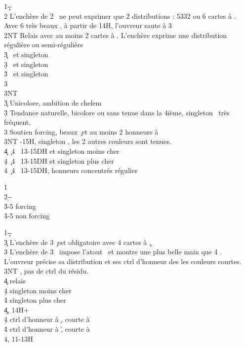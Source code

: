 \documentclass[a4paper]{article}
\begin{document}
\begin{bidtable}
1\c--\\
2\s \> L’enchère de 2 \s\ ne peut exprimer que 2 distributions : 5332 ou 6 cartes à \s .\\
\>Avec 6 très beaux \s , à partir de 14H, l’ouvreur saute à 3 \s \+\\
2NT \> Relais avec au moins 2 cartes à \s . L’enchère exprime une distribution régulière ou semi-régulière\+\\
3\c {} \s\ et singleton \c \\
3\d {} \s\ et singleton \d \\
3\h {} \s\ et singleton \h \\
3\s {}\\
3NT \-\\
3\c \> Unicolore, ambition de chelem\\
3\d\h \> Tendance naturelle, bicolore ou sans tenue dans la 4ième, singleton \s\ très fréquent.\\
3\s \> Soutien forcing, beaux \c\ et au moins 2 honneurs à \s \\
3NT -15H, singleton \s , les 2 autres couleurs sont tenues.\\
4\c {} \c\ 4 \s\ 13-15DH et singleton moins cher\\
4\d {} \c\ 4 \s\ 13-15DH et singleton plus cher\\
4\s {} \c\ 4 \s\ 13-15DH, honneurs concentrés régulier\-
\end{bidtable}

\begin{bidtable}
1\c\\
2\d--\\
3\h {}-5 forcing\\
4\h {}-5 non forcing
\end{bidtable}

\begin{bidtable}
1\c--\\
3\c \> L’enchère de 3 \c\ est obligatoire avec 4 cartes à \c .\+\\
3\s \> L’enchère de 3 \s\ impose l’atout \s\ et montre une plus belle main que 4 \s .\\
\>L’ouvreur précise sa distribution et ses ctrl d’honneur des les couleurs courtes.\+\\
3NT , pas de ctrl du résidu.\+\\
4\c \> relais\+\\
4\d \> singleton moins cher\\
4\h \> singleton plus cher\-\-\\
4\c {}, 14H+\\
4\d \> ctrl d’honneur à \d , courte à \h \\
4\h \> ctrl d’honneur à \h , courte à \d \\
4\s {}, 11-13H\-\-
\end{bidtable}
\end{document}
